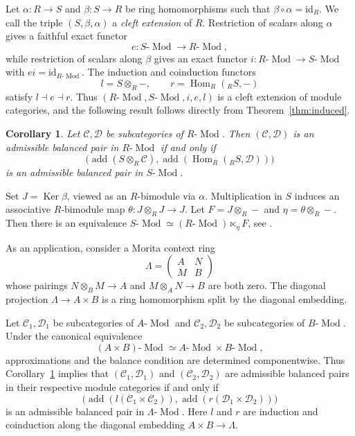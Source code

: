 \documentclass[11pt]{amsart}
\newtheorem{corollary}[theorem]{Corollary}
\theoremstyle{definition}
\theoremstyle{remark}
\theoremstyle{plain}
\numberwithin{equation}{section}
\begin{document}
Let $\alpha:R\to S$ and $\beta:S\to R$ be ring homomorphisms such that $\beta\circ\alpha=\mathrm{id}_R$. We call the triple $(S,\beta,\alpha)$ a \emph{cleft extension} of $R$. Restriction of scalars along $\alpha$ gives a faithful exact functor
\[
e:S\text{-}\operatorname{Mod}\longrightarrow
R\text{-}\operatorname{Mod},
\]
while restriction of scalars along $\beta$ gives an exact functor
$i:R\text{-}\operatorname{Mod}\to S\text{-}\operatorname{Mod}$ with $ei=\mathrm{id}_{R\text{-}\operatorname{Mod}}$.
The induction and coinduction functors
\[
l=S\otimes_R-,
\qquad
r=\operatorname{Hom}_R({}_RS,-)
\]
satisfy $l\dashv e\dashv r$. Thus $(R\text{-}\operatorname{Mod},S\text{-}\operatorname{Mod},i,e,l)$
is a cleft extension of module categories, and the following result follows directly from Theorem~\ref{thm:induced}.
\begin{corollary}\label{cor:split-rings}
	Let $\mathcal{C},\mathcal{D}$ be subcategories of
	$R\text{-}\operatorname{Mod}$.
	Then $(\mathcal{C},\mathcal{D})$ is an admissible balanced pair
	in $R\text{-}\operatorname{Mod}$ if and only if
	\[
	\bigl(
	\operatorname{add}(S\otimes_R\mathcal{C}),
	\operatorname{add}(\operatorname{Hom}_R({}_RS,\mathcal{D}))
	\bigr)
	\]
	is an admissible balanced pair in $S\text{-}\operatorname{Mod}$.
\end{corollary}

Set $J=\operatorname{Ker}\beta$, viewed as an $R$-bimodule via $\alpha$. Multiplication in $S$ induces an associative $R$-bimodule map
$\theta:J\otimes_R J\longrightarrow J$. Let $F=J\otimes_R-$ and $\eta=\theta\otimes_R-$. Then there is an equivalence $S\text{-}\operatorname{Mod}\simeq (R\text{-}\operatorname{Mod})\ltimes_\eta F$, see \cite[Section~3]{BelCleft}.

As an application, consider a Morita context ring
\[
\Lambda=\begin{pmatrix}A&N\\ M&B\end{pmatrix}
\]
whose pairings $N\otimes_B M\to A$ and $M\otimes_A N\to B$ are both zero. The diagonal projection
$\Lambda\to A\times B$ is a ring homomorphism split by the diagonal embedding.

Let $\mathcal{C}_1,\mathcal{D}_1$ be subcategories of $A\text{-}\operatorname{Mod}$
and $\mathcal{C}_2,\mathcal{D}_2$ be subcategories of $B\text{-}\operatorname{Mod}$. Under the canonical equivalence
\[
(A\times B)\text{-}\operatorname{Mod}
\simeq A\text{-}\operatorname{Mod}\times B\text{-}\operatorname{Mod},
\]
approximations and the balance condition are determined componentwise. Thus Corollary~\ref{cor:split-rings} implies that
$(\mathcal{C}_1,\mathcal{D}_1)$ and
$(\mathcal{C}_2,\mathcal{D}_2)$ are admissible balanced pairs in their respective module categories if and only if
\[
\bigl(
\operatorname{add}(l(\mathcal{C}_1\times\mathcal{C}_2)),
\operatorname{add}(r(\mathcal{D}_1\times\mathcal{D}_2))
\bigr)
\]
is an admissible balanced pair in
$\Lambda\text{-}\operatorname{Mod}$. Here $l$ and $r$ are induction and coinduction along the
diagonal embedding $A\times B\to\Lambda$.
\end{document}
